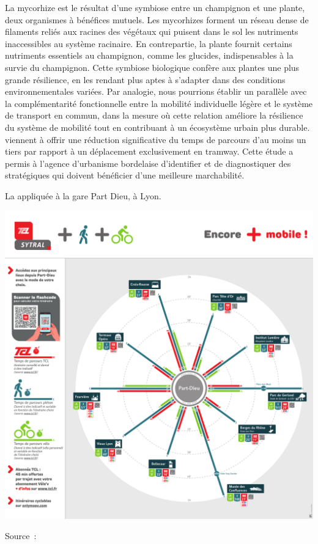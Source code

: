 \begin{refsegment}
{La mycorhize est le résultat d'une symbiose entre un champignon et une plante, deux organismes à bénéfices mutuels. Les mycorhizes forment un réseau dense de filaments reliés aux racines des végétaux qui puisent dans le sol les nutriments inaccessibles au système racinaire. En contrepartie, la plante fournit certains nutriments essentiels au champignon, comme les glucides, indispensables à la survie du champignon. Cette symbiose biologique confère aux plantes une plus grande résilience, en les rendant plus aptes à s'adapter dans des conditions environnementales variées. Par analogie, nous pourrions établir un parallèle avec la complémentarité fonctionnelle entre la mobilité individuelle légère et le système de transport en commun, dans la mesure où cette relation améliore la résilience du système de mobilité tout en contribuant à un écosystème urbain plus \gls{durable}.
} viennent à offrir une réduction significative du temps de parcours d'au moins un tiers par rapport à un déplacement exclusivement en tramway. Cette étude a permis à l'agence d'urbanisme bordelaise d'identifier et de diagnostiquer des  stratégiques qui doivent bénéficier d'une meilleure \gls{marchabilité}.%

    \begin{carte}[h!]\vspace*{4pt}
        \caption{La  appliquée à la gare Part Dieu, à Lyon.}
        \label{fig-chap5:rose-modes-reseau-part-dieu}
        \centerline{\includegraphics[width=1\columnwidth]{src/Figures/Chap-5/FR_Detours_Part_Dieu_rose_des_modes_TCL_FR.pdf}}
        \vspace{5pt}
        \begin{flushright}\scriptsize{
        Source~: \textcolor{blue}{\textcite{tcl_transports_2023}}
        }\end{flushright}
    \end{carte}


\end{refsegment}
